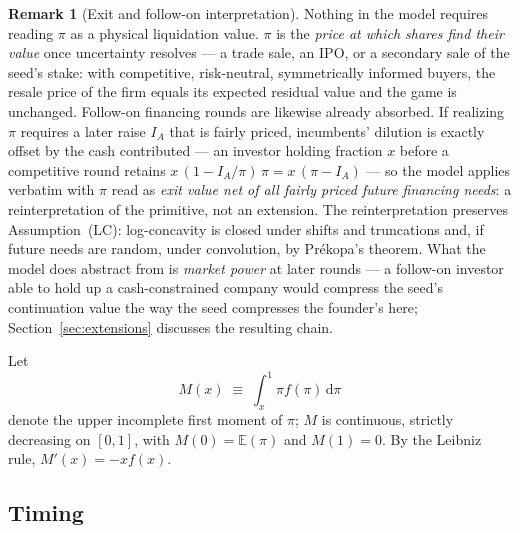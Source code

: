 \documentclass[11pt]{article}
\theoremstyle{definition}
\newtheorem{remark}{Remark}
\newcommand{\E}{\mathbb{E}}
\newcommand{\dd}{\,\mathrm{d}}
\begin{document}
\begin{remark}[Exit and follow-on interpretation]\label{rem:exit}
Nothing in the model requires reading $\pi$ as a physical liquidation value. $\pi$ is the \emph{price at which shares find their value} once uncertainty resolves --- a trade sale, an IPO, or a secondary sale of the seed's stake: with competitive, risk-neutral, symmetrically informed buyers, the resale price of the firm equals its expected residual value and the game is unchanged. Follow-on financing rounds are likewise already absorbed. If realizing $\pi$ requires a later raise $I_A$ that is fairly priced, incumbents' dilution is exactly offset by the cash contributed --- an investor holding fraction $x$ before a competitive round retains $x\,(1-I_A/\pi)\,\pi = x\,(\pi-I_A)$ --- so the model applies verbatim with $\pi$ read as \emph{exit value net of all fairly priced future financing needs}: a reinterpretation of the primitive, not an extension. The reinterpretation preserves Assumption~(LC): log-concavity is closed under shifts and truncations and, if future needs are random, under convolution, by Pr\'ekopa's theorem. What the model does abstract from is \emph{market power} at later rounds --- a follow-on investor able to hold up a cash-constrained company would compress the seed's continuation value the way the seed compresses the founder's here; Section~\ref{sec:extensions} discusses the resulting chain.
\end{remark}

Let
\[
M(x) \;\equiv\; \int_x^1 \pi f(\pi)\dd\pi
\]
denote the upper incomplete first moment of $\pi$; $M$ is continuous, strictly decreasing on $[0,1]$, with $M(0)=\E(\pi)$ and $M(1)=0$. By the Leibniz rule, $M'(x) = -x f(x)$.

\subsection{Timing}
\end{document}
